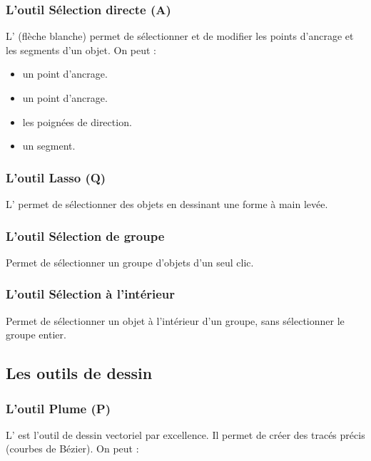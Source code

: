 \subsubsection{L'outil Sélection directe (A)}

L' (flèche blanche) permet de sélectionner et de modifier les points d'ancrage et les segments d'un objet. On peut :

\begin{itemize}
    \item {} un point d'ancrage.
    \item {} un point d'ancrage.
    \item {} les poignées de direction.
    \item {} un segment.
\end{itemize}

\subsubsection{L'outil Lasso (Q)}

L' permet de sélectionner des objets en dessinant une forme à main levée.

\subsubsection{L'outil Sélection de groupe}

Permet de sélectionner un groupe d'objets d'un seul clic.

\subsubsection{L'outil Sélection à l'intérieur}

Permet de sélectionner un objet à l'intérieur d'un groupe, sans sélectionner le groupe entier.

\subsection{Les outils de dessin}

\subsubsection{L'outil Plume (P)}

L' est l'outil de dessin vectoriel par excellence. Il permet de créer des tracés précis (courbes de Bézier). On peut :

